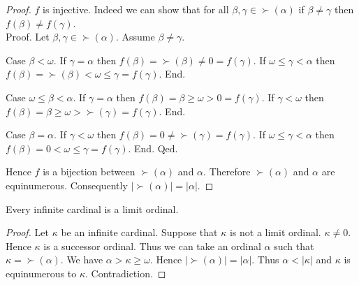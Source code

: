 \documentclass[../set-theory.tex]{subfiles}
\begin{document}
\begin{forthel}
\begin{proof}
      $f$ is injective.
      Indeed we can show that for all $\beta, \gamma \in \succ(\alpha)$ if
      $\beta \neq \gamma$ then $f(\beta) \neq f(\gamma)$. \\
      Proof.
        Let $\beta, \gamma \in \succ(\alpha)$.
        Assume $\beta \neq \gamma$.

        Case $\beta < \omega$.
          If $\gamma = \alpha$ then
          $f(\beta)
            = \succ(\beta)
            \neq 0
            = f(\gamma)$.
          If $\omega \leq \gamma < \alpha$ then
          $f(\beta)
            = \succ(\beta)
            < \omega
            \leq \gamma
            = f(\gamma)$.
        End.

        Case $\omega \leq \beta < \alpha$.
          If $\gamma = \alpha$ then
          $f(\beta)
            = \beta
            \geq \omega
            > 0
            = f(\gamma)$.
          If $\gamma < \omega$ then
          $f(\beta)
            = \beta
            \geq \omega
            > \succ(\gamma)
            = f(\gamma)$.
        End.

        Case $\beta = \alpha$.
          If $\gamma < \omega$ then
          $f(\beta)
            = 0
            \neq \succ(\gamma)
            = f(\gamma)$.
          If $\omega \leq \gamma < \alpha$ then
          $f(\beta)
            = 0
            < \omega
            \leq \gamma
            = f(\gamma)$.
        End.
      Qed.

      Hence $f$ is a bijection between $\succ(\alpha)$ and $\alpha$.
      Therefore $\succ(\alpha)$ and $\alpha$ are equinumerous.
      Consequently $|\succ(\alpha)| = |\alpha|$.
    \end{proof}
  \end{forthel}

  \begin{forthel}
    \begin{proposition}
      Every infinite cardinal is a limit ordinal.
    \end{proposition}
    \begin{proof}
      Let $\kappa$ be an infinite cardinal.
      Suppose that $\kappa$ is not a limit ordinal.
      $\kappa \neq 0$.
      Hence $\kappa$ is a successor ordinal.
      Thus we can take an ordinal $\alpha$ such that $\kappa = \succ(\alpha)$.
      We have $\alpha > \kappa \geq \omega$.
      Hence $|\succ(\alpha)| = |\alpha|$.
      Thus $\alpha < |\kappa|$ and $\kappa$ is equinumerous to $\kappa$.
      Contradiction.
    \end{proof}
  \end{forthel}
\end{document}
